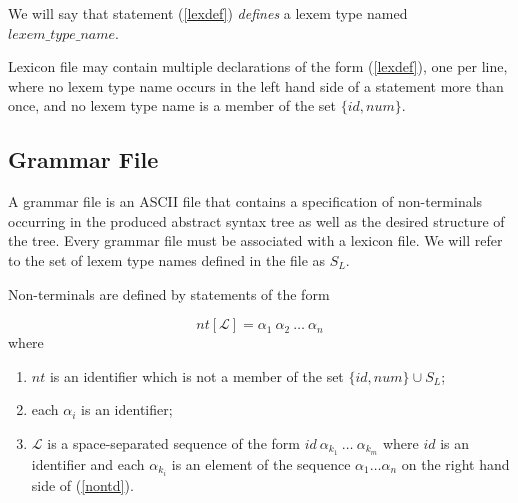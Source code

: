 \documentclass[a4paper,10pt]{article}
\begin{document}
We will say that statement (\ref{lexdef}) \textit{defines} a lexem type named $lexem\_type\_name$.

Lexicon file may contain multiple declarations of the form (\ref{lexdef}), one per line, where no lexem type name occurs in the left hand side of a statement more than once, and no lexem type name is a member of the set $\{id, num\}  $.
 
\subsection{Grammar File}\label{gf}
A grammar file is an ASCII file that contains a specification of non-terminals occurring in the produced abstract syntax tree as well as the desired structure of the tree. Every grammar file must be associated with a lexicon file. We will refer to the set of lexem type names defined in the file as $S_L$.  

Non-terminals are defined by  statements of the form 

\begin{equation}\label{nontd}
nt[\mathcal{L}] = \alpha_1~\alpha_2~\ldots~\alpha_n 
\end{equation}
where 
\begin{enumerate}
\item $nt$ is an identifier which is not a member of the set $\{id,num\}\cup S_L$;
\item each $\alpha_i$  is an identifier;
\item $\mathcal{L}$ is a  space-separated sequence  of the form $id~\alpha_{k_1}~\ldots~\alpha_{k_m}$
where $id$ is an identifier and each  $\alpha_{k_i}$ 
is an element of the sequence   $\alpha_1\ldots \alpha_n$  on the right hand side of (\ref{nontd}).
\end{enumerate}
\end{document}
